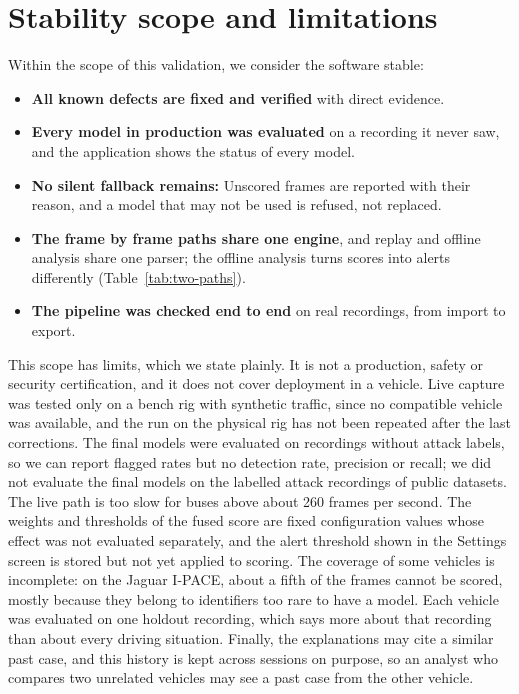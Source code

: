 \section{Stability scope and limitations}
\label{sec:limitations}

Within the scope of this validation, we consider the software stable:

\begin{itemize}
    \item \textbf{All known defects are fixed and verified} with direct evidence.
    \item \textbf{Every model in production was evaluated} on a recording it never saw, and the application shows the status of every model.
    \item \textbf{No silent fallback remains:} Unscored frames are reported with their reason, and a model that may not be used is refused, not replaced.
    \item \textbf{The frame by frame paths share one engine}, and replay and offline analysis share one parser; the offline analysis turns scores into alerts differently (Table~\ref{tab:two-paths}).
    \item \textbf{The pipeline was checked end to end} on real recordings, from import to export.
\end{itemize}

This scope has limits, which we state plainly. It is not a production, safety or security certification, and it does not cover deployment in a vehicle. Live capture was tested only on a bench rig with synthetic traffic, since no compatible vehicle was available, and the run on the physical rig has not been repeated after the last corrections. The final models were evaluated on recordings without attack labels, so we can report flagged rates but no detection rate, precision or recall; we did not evaluate the final models on the labelled attack recordings of public datasets. The live path is too slow for buses above about 260 frames per second. The weights and thresholds of the fused score are fixed configuration values whose effect was not evaluated separately, and the alert threshold shown in the Settings screen is stored but not yet applied to scoring. The coverage of some vehicles is incomplete: on the Jaguar I-PACE, about a fifth of the frames cannot be scored, mostly because they belong to identifiers too rare to have a model. Each vehicle was evaluated on one holdout recording, which says more about that recording than about every driving situation. Finally, the explanations may cite a similar past case, and this history is kept across sessions on purpose, so an analyst who compares two unrelated vehicles may see a past case from the other vehicle.

